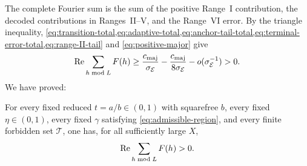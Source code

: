 The complete Fourier sum is the sum of the positive Range~I contribution, the decoded contributions in Ranges~II--V, and the Range~VI error. By the triangle inequality, \cref{eq:transition-total,eq:adaptive-total,eq:anchor-tail-total,eq:terminal-error-total,eq:range-II-tail} and \cref{eq:positive-major} give
\[
 \operatorname{Re}\sum_{h\bmod L}F(h)
 \geq\frac{c_{\rm maj}}{\sigma_{\mathcal E}}
 -\frac{c_{\rm maj}}{8\sigma_{\mathcal E}}
 -o(\sigma_{\mathcal E}^{-1})>0.
\]
We have proved:

\begin{theorem}
\label{thm:positive-fourier-numerator}
For every fixed reduced $t=a/b\in(0,1)$ with squarefree $b$, every fixed $\eta\in(0,1)$, every fixed $\gamma$ satisfying \cref{eq:admissible-region}, and every finite forbidden set $\mathcal T$, one has, for all sufficiently large $X$,
\[
 \operatorname{Re}\sum_{h\bmod L}F(h)>0.
\]
\end{theorem}

